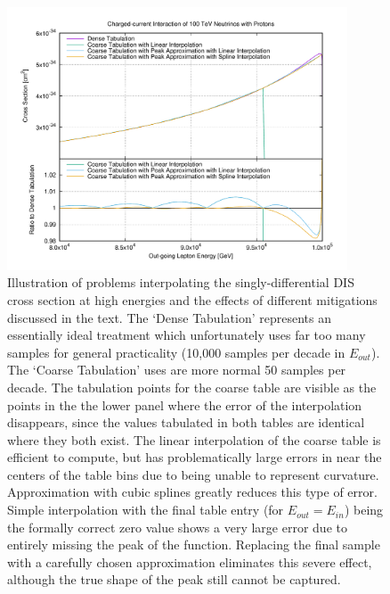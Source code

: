 \documentclass[3p,12pt]{elsarticle}
\begin{document}
\begin{figure}
  \centering
  \includegraphics[width=0.9\textwidth]{fig/cross_section_interpolation.pdf}
  \caption{Illustration of problems interpolating the singly-differential DIS cross section at high energies and the effects of different mitigations discussed in the text. The `Dense Tabulation' represents an essentially ideal treatment which unfortunately uses far too many samples for general practicality (10,000 samples per decade in $E_{out}$). The `Coarse Tabulation' uses are more normal 50 samples per decade. The tabulation points for the coarse table are visible as the points in the the lower panel where the error of the interpolation disappears, since the values tabulated in both tables are identical where they both exist. The linear interpolation of the coarse table is efficient to compute, but has problematically large errors in near the centers of the table bins due to being unable to represent curvature. Approximation with cubic splines greatly reduces this type of error. Simple interpolation with the final table entry (for $E_{out} = E_{in}$) being the formally correct zero value shows a very large error due to entirely missing the peak of the function. Replacing the final sample with a carefully chosen approximation eliminates this severe effect, although the true shape of the peak still cannot be captured.}
  \label{fig:cross_interp}
\end{figure}
\end{document}
